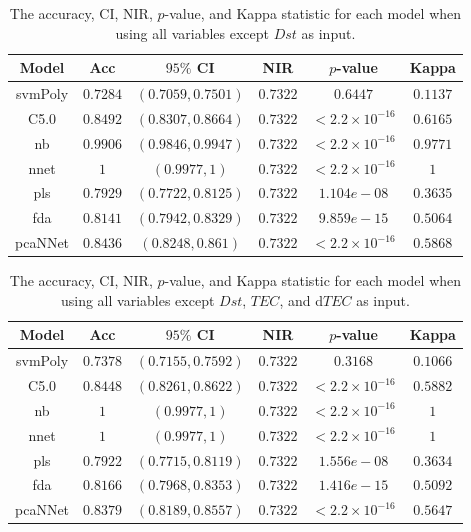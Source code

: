 \documentclass[preprint,12pt]{elsarticle}
\begin{document}
\begin{table}[!ht]
	\centering
	\begin{tabular}{|c|c|c|c|c|c|}
		\hline
		Model & Acc & $95\%$ CI & NIR & $p$-value & Kappa \\ \hline
		svmPoly & $0.7284$ & $(0.7059, 0.7501)$ & $0.7322$ & $0.6447$ & $0.1137$ \\ \hline
		C5.0 & $0.8492$ & $(0.8307, 0.8664)$ & $0.7322$ & $< 2.2 \times {10}^{-16}$ & $0.6165$ \\ \hline
		nb & $0.9906$ & $(0.9846, 0.9947)$ & $0.7322$ & $< 2.2 \times {10}^{-16}$ & $0.9771$ \\ \hline
		nnet & $1$ & $(0.9977, 1)$ & $0.7322$ & $< 2.2 \times {10}^{-16}$ & $1$ \\ \hline
		pls & $0.7929$ & $(0.7722, 0.8125)$ & $0.7322$ & $1.104e-08$ & $0.3635$ \\ \hline
		fda & $0.8141$ & $(0.7942, 0.8329)$ & $0.7322$ & $9.859e-15$ & $0.5064$ \\ \hline
		pcaNNet & $0.8436$ & $(0.8248, 0.861)$ & $0.7322$ & $< 2.2 \times {10}^{-16}$ & $0.5868$ \\ \hline
	\end{tabular}
	\caption{The accuracy, CI, NIR, $p$-value, and Kappa statistic for each model when using all variables except $Dst$ as input.}
	\label{tab:stats:reverse:no$Dst$}
\end{table}

\begin{table}[!ht]
	\centering
	\begin{tabular}{|c|c|c|c|c|c|}
		\hline
		Model & Acc & $95\%$ CI & NIR & $p$-value & Kappa \\ \hline
		svmPoly & $0.7378$ & $(0.7155, 0.7592)$ & $0.7322$ & $0.3168$ & $0.1066$ \\ \hline
		C5.0 & $0.8448$ & $(0.8261, 0.8622)$ & $0.7322$ & $< 2.2 \times {10}^{-16}$ & $0.5882$ \\ \hline
		nb & $1$ & $(0.9977, 1)$ & $0.7322$ & $< 2.2 \times {10}^{-16}$ & $1$ \\ \hline
		nnet & $1$ & $(0.9977, 1)$ & $0.7322$ & $< 2.2 \times {10}^{-16}$ & $1$ \\ \hline
		pls & $0.7922$ & $(0.7715, 0.8119)$ & $0.7322$ & $1.556e-08$ & $0.3634$ \\ \hline
		fda & $0.8166$ & $(0.7968, 0.8353)$ & $0.7322$ & $1.416e-15$ & $0.5092$ \\ \hline
		pcaNNet & $0.8379$ & $(0.8189, 0.8557)$ & $0.7322$ & $< 2.2 \times {10}^{-16}$ & $0.5647$ \\ \hline
	\end{tabular}
	\caption{The accuracy, CI, NIR, $p$-value, and Kappa statistic for each model when using all variables except $Dst$, $TEC$, and d$TEC$ as input.}
	\label{tab:stats:reverse:no$TEC$}
\end{table}
\end{document}

